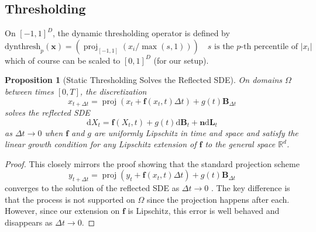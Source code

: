 \documentclass{article}
\theoremstyle{plain}
\newtheorem{proposition}[theorem]{Proposition}
\theoremstyle{definition}
\theoremstyle{remark}
\DeclareMathOperator{\proj}{proj}
\newcommand{\R}{\mathbb{R}}
\renewcommand{\vec}{\mathbf}
\newcommand{\dd}{\mathrm{d}}
\begin{document}
\subsection{Thresholding}\label{sec:app:theory:thresh}

On $[-1, 1]^D$, the dynamic thresholding operator is defined by
\begin{equation}
    \mathrm{dynthresh}_p(\vec{x}) = (\proj_{[-1, 1]}(x_i / \max(s, 1))) \quad s \text{ is the } p\text{-th percentile of } |x_i|
\end{equation}
which of course can be scaled to $[0, 1]^D$ (for our setup).
\begin{proposition}[Static Thresholding Solves the Reflected SDE]
    On domains $\Omega$ between times $[0, T]$, the discretization
    \begin{equation}
        x_{t + \Delta t} = \proj(x_t + \vec{f}(x_t, t) \Delta t) + g(t) \vec{B}_{\Delta t}
    \end{equation}
    solves the reflected SDE
    \begin{equation}
        \dd X_t = \vec{f}(X_t, t) + g(t) \dd \vec{B}_t + \vec{n} \dd \vec{L}_t
    \end{equation}
    as $\Delta t \to 0$ when $\vec{f}$ and $g$ are uniformly Lipschitz in time and space and satisfy the linear growth condition for any Lipschitz extension of $\vec{f}$ to the general space $\R^d$.
\end{proposition}

\begin{proof}
    This closely mirrors the proof showing that the standard projection scheme
    \begin{equation}
        y_{t + \Delta t} = \proj(y_t + \vec{f}(x_t, t) \Delta t) + g(t) \vec{B}_{\Delta t}
    \end{equation}
    converges to the solution of the reflected SDE as $\Delta t \to 0$ \citep{Skorokhod1961StochasticEF, Schuss2013BrownianDA, Liu1993NumericalAT}. The key difference is that the process is not supported on $\Omega$ since the projection happens after each. However, since our extension on $\vec{f}$ is Lipschitz, this error is well behaved and disappears as $\Delta t \to 0$.
\end{proof}
\end{document}
